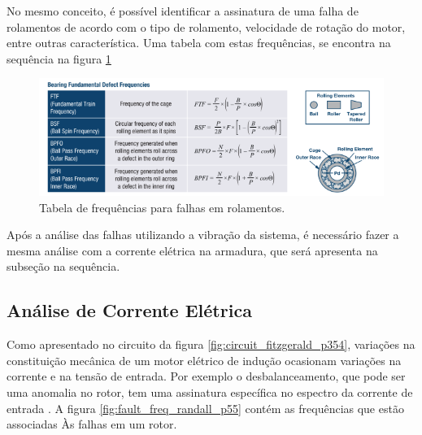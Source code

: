 No mesmo conceito, é possível identificar a assinatura de uma falha de rolamentos de acordo com o tipo de rolamento, velocidade de rotação
do motor, entre outras característica. Uma tabela com estas frequências, se encontra na sequência na figura \ref{fig:bearing_table_analog_p3}


\begin{figure}[H]
    \caption{Tabela de frequências para falhas em rolamentos.}
    \begin{center}
        \includegraphics[scale=.7]{referencial/img/bearing_table_analog_p3.png}
    \end{center}
    \label{fig:bearing_table_analog_p3}
\end{figure}

Após a análise das falhas utilizando a vibração da sistema, é necessário fazer a mesma análise com a corrente elétrica na armadura, 
que será apresenta na subseção na sequência.


% 

\subsection{Análise de Corrente Elétrica }\label{sec:}

Como apresentado no circuito da figura \ref{fig:circuit_fitzgerald_p354}, variações na constituição mecânica de um motor elétrico de 
indução ocasionam variações na corrente e na tensão de entrada. Por exemplo o desbalanceamento, que pode ser uma anomalia no rotor,
tem uma assinatura específica no espectro da corrente de entrada \cite{Wu2013}.  A figura \ref{fig:fault_freq_randall_p55} contém as
frequências que estão associadas Às falhas em um rotor.

